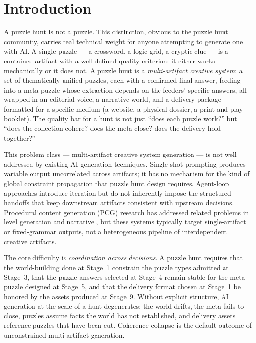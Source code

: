 \section{Introduction}
\label{sec:introduction}

A puzzle hunt is not a puzzle. This distinction, obvious to the puzzle hunt community,
carries real technical weight for anyone attempting to generate one with AI. A single puzzle
--- a crossword, a logic grid, a cryptic clue --- is a contained artifact with a well-defined
quality criterion: it either works mechanically or it does not. A puzzle hunt is a
\emph{multi-artifact creative system}: a set of thematically unified puzzles, each with a
confirmed final answer, feeding into a meta-puzzle whose extraction depends on the feeders'
specific answers, all wrapped in an editorial voice, a narrative world, and a delivery
package formatted for a specific medium (a website, a physical dossier, a print-and-play
booklet). The quality bar for a hunt is not just ``does each puzzle work?'' but ``does the
collection cohere? does the meta close? does the delivery hold together?''

This problem class --- multi-artifact creative system generation --- is not well addressed by
existing AI generation techniques. Single-shot prompting produces variable output
uncorrelated across artifacts; it has no mechanism for the kind of global constraint
propagation that puzzle hunt design requires. Agent-loop approaches
\cite{park2023generativeagents,nakajima2023babyagi} introduce iteration but do not
inherently impose the structured handoffs that keep downstream artifacts consistent with
upstream decisions. Procedural content generation (PCG) research has addressed related
problems in level generation \cite{shaker2016procedural,summerville2018procedural} and
narrative \cite{roemmele2015creative,kreminski2020why}, but these systems typically target
single-artifact or fixed-grammar outputs, not a heterogeneous pipeline of interdependent
creative artifacts.

The core difficulty is \emph{coordination across decisions}. A puzzle hunt requires that the
world-building done at Stage~1 constrain the puzzle types admitted at Stage~3, that the
puzzle answers selected at Stage~4 remain stable for the meta-puzzle designed at Stage~5,
and that the delivery format chosen at Stage~1 be honored by the assets produced at
Stage~9. Without explicit structure, AI generation at the scale of a hunt degenerates: the
world drifts, the meta fails to close, puzzles assume facts the world has not established,
and delivery assets reference puzzles that have been cut. Coherence collapse is the default
outcome of unconstrained multi-artifact generation.

